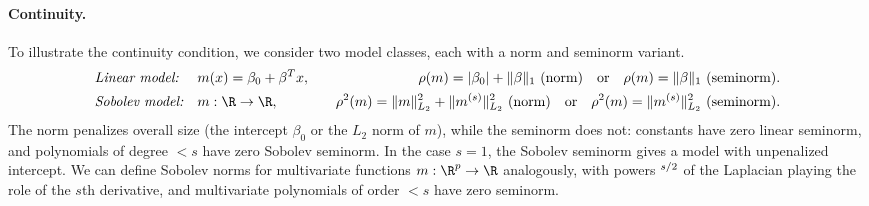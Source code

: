 \documentclass{article}
\let\laplacian\relax
\DeclareMathOperator{\laplacian}{\Delta}
\begin{document}
\paragraph{Continuity.}
To illustrate the continuity condition, we consider two model classes, each with a norm and seminorm variant.
\[
\begin{aligned}
&\textit{Linear model:}
  &&m(x) = \beta_0 + \beta^T x,
  &&&\rho(m) = |\beta_0| + \|\beta\|_1 \text{ (norm)}
  \quad\text{or}\quad
  \rho(m) = \|\beta\|_1 \text{ (seminorm)}.
  \\
&\textit{Sobolev model:}
  && m: \R \to \R,
  &&&\rho^2(m) = \|m\|_{L_2}^2 + \|m^{(s)}\|_{L_2}^2 \text{ (norm)}
  \quad\text{or}\quad
  \rho^2(m) = \|m^{(s)}\|_{L_2}^2 \text{ (seminorm)}.
\end{aligned}
\]
The norm penalizes overall size (the intercept $\beta_0$ or the $L_2$ norm of $m$), while the seminorm does not: constants have zero linear seminorm, and polynomials of degree $< s$ have zero Sobolev seminorm. In the case $s=1$, the Sobolev seminorm gives a model with unpenalized intercept. We can define Sobolev norms for multivariate functions $m: \R^p \to \R$ analogously, with powers $\laplacian^{s/2}$ of the Laplacian playing the role of the $s$th derivative, and multivariate polynomials of order $< s$ have zero seminorm.
\end{document}

